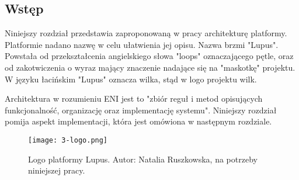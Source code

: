 \subsection{Wstęp}

Niniejszy rozdział przedstawia zaproponowaną w pracy architekturę  platformy. Platformie nadano nazwę w celu ułatwienia jej opisu. Nazwa brzmi "Lupus". Powstała od przekształcenia angielskiego słowa "loops" oznaczającego pętle, oraz od zakotwiczenia o wyraz mający znaczenie nadające się na "maskotkę" projektu. W języku łacińskim "Lupus" oznacza wilka, stąd w logo projektu wilk. 

Architektura w rozumieniu ENI jest to "zbiór reguł i metod opisujących funkcjonalność, organizację oraz implementację systemu". Niniejszy rozdział pomija aspekt implementacji, która jest omówiona w następnym rozdziale.

\begin{figure}[h]
    \centering
    \texttt{[image: 3-logo.png]}
    \caption{Logo platformy Lupus. Autor: Natalia Ruszkowska, na potrzeby niniejszej pracy.}
    \label{fig:logo}
\end{figure}